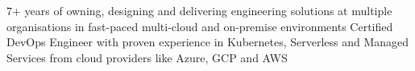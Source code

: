 
7+ years of owning, designing and delivering engineering solutions at multiple organisations in fast-paced multi-cloud and on-premise environments\@
Certified DevOps Engineer with proven experience in Kubernetes, Serverless and Managed Services from cloud providers like Azure, GCP and AWS\@